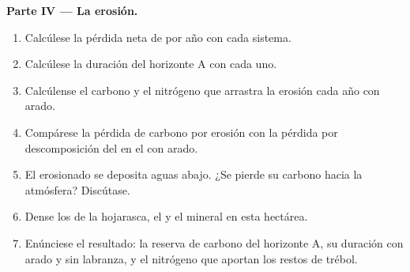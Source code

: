 \begin{problem}
\medskip
\noindent\textbf{Parte IV --- La erosión.}
\begin{enumerate}[resume]
  \item Calcúlese la pérdida neta de  por año con cada sistema.
  \item Calcúlese la duración del horizonte A con cada uno.
  \item Calcúlense el carbono y el nitrógeno que arrastra la erosión cada
        año con arado.
  \item Compárese la pérdida de carbono por erosión con la pérdida por
        descomposición del  en el  con arado.
  \item El  erosionado se deposita aguas abajo. ¿Se pierde su carbono
        hacia la atmósfera? Discútase.
  \item Dense los  de la hojarasca, el  y el 
        mineral en esta hectárea.
  \item Enúnciese el resultado: la reserva de carbono del horizonte A, su
        duración con arado y sin labranza, y el nitrógeno que aportan los
        restos de trébol.
\end{enumerate}
\end{problem}
